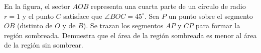 En la figura, el sector $AOB$ representa una cuarta parte de un círculo de radio $r = 1$ y el punto $C$ satisface que $\angle BOC = 45^\circ$. Sea $P$ un punto sobre el segmento $OB$ (distinto de $O$ y de $B$). Se trazan los segmentos $AP$ y $CP$ para formar la región sombreada. Demuestra que el área de la región sombreada es menor al área de la región sin sombrear.